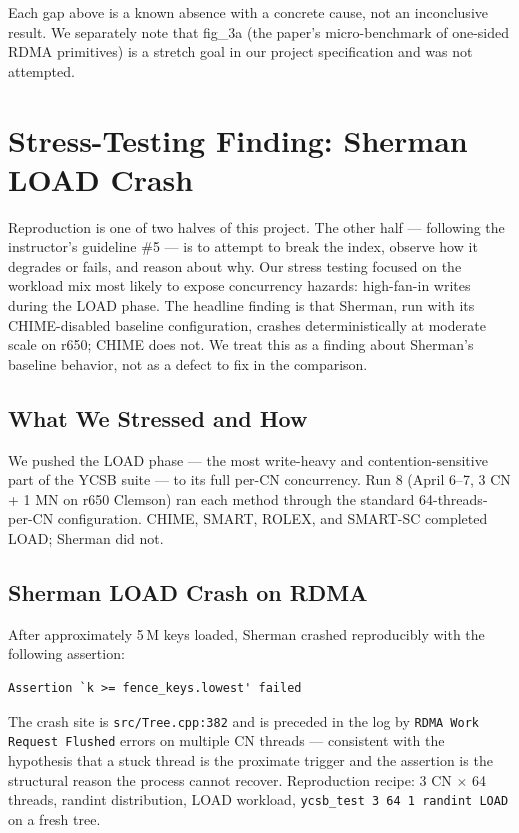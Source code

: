 \documentclass[11pt,a4paper]{article}
\begin{document}
Each gap above is a known absence with a concrete cause, not an inconclusive result. We separately note that fig\_3a (the paper's micro-benchmark of one-sided RDMA primitives) is a stretch goal in our project specification and was not attempted.

\section{Stress-Testing Finding: Sherman LOAD Crash}
\label{sec:stress}


Reproduction is one of two halves of this project. The other half --- following the instructor's guideline \#5 --- is to attempt to break the index, observe how it degrades or fails, and reason about why. Our stress testing focused on the workload mix most likely to expose concurrency hazards: high-fan-in writes during the LOAD phase. The headline finding is that Sherman, run with its CHIME-disabled baseline configuration, crashes deterministically at moderate scale on r650; CHIME does not. We treat this as a finding about Sherman's baseline behavior, not as a defect to fix in the comparison.

\subsection{What We Stressed and How}

We pushed the LOAD phase --- the most write-heavy and contention-sensitive part of the YCSB suite --- to its full per-CN concurrency. Run 8 (April 6--7, 3 CN + 1 MN on r650 Clemson) ran each method through the standard 64-threads-per-CN configuration. CHIME, SMART, ROLEX, and SMART-SC completed LOAD; Sherman did not.

\subsection{Sherman LOAD Crash on RDMA}
\label{sec:stress-sherman-crash}

After approximately 5\,M keys loaded, Sherman crashed reproducibly with the following assertion:

\begin{lstlisting}
Assertion `k >= fence_keys.lowest' failed
\end{lstlisting}

The crash site is \texttt{src/Tree.cpp:382} and is preceded in the log by \texttt{RDMA Work Request Flushed} errors on multiple CN threads --- consistent with the hypothesis that a stuck thread is the proximate trigger and the assertion is the structural reason the process cannot recover. Reproduction recipe: 3 CN $\times$ 64 threads, randint distribution, LOAD workload, \texttt{ycsb\_test 3 64 1 randint LOAD} on a fresh tree.
\end{document}
